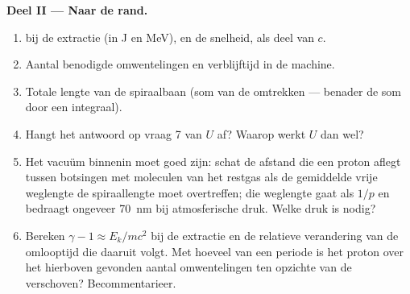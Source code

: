 \begin{problem}
\medskip
\noindent\textbf{Deel II --- Naar de rand.}
\begin{enumerate}[resume]
  \item {} bij de extractie (in J en MeV), en de snelheid, als
        deel van $c$.
  \item Aantal benodigde omwentelingen en verblijftijd in de machine.
  \item Totale lengte van de spiraalbaan (som van de omtrekken ---
        benader de som door een integraal).
  \item Hangt het antwoord op vraag 7 van $U$ af? Waarop werkt $U$
        dan wel?
  \item Het vacuüm binnenin moet goed zijn: schat de afstand die een proton
        aflegt tussen botsingen met moleculen van het restgas als de
        gemiddelde vrije weglengte de spiraallengte moet overtreffen; die
        weglengte gaat als $1/p$ en bedraagt ongeveer \qty{70}{nm} bij
        atmosferische druk. Welke druk is nodig?
  \item Bereken $\gamma - 1 \approx E_k/mc^2$ bij de extractie en de
        relatieve verandering van de omlooptijd die daaruit volgt. Met hoeveel
        van een periode is het proton over het hierboven gevonden aantal
        omwentelingen ten opzichte van de  verschoven? Becommentarieer.
\end{enumerate}


\end{problem}
